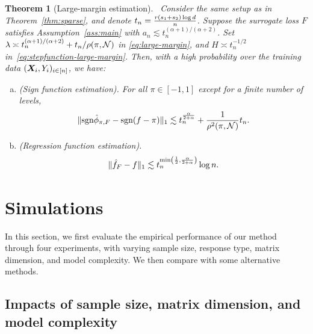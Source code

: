 \documentclass[aos]{imsart}
\newtheorem{theorem}{Theorem}%
\theoremstyle{definition}
\def\sign{\textup{sgn}}
\def\NonparaM{\text{\bf \footnotesize ASSIST }}
\begin{document}
\begin{theorem}[Large-margin estimation]~\label{thm:extension} 
Consider the same setup as in Theorem~\ref{thm:sparse}, and denote $t_n = {r(s_1+s_2)\log d \over n}$. Suppose the surrogate loss $F$ satisfies Assumption~\ref{ass:main} with $a_n \lesssim t_n^{(\alpha+1)/(\alpha+2)}$. Set $\lambda\asymp t_n^{(\alpha+1)/(\alpha+2)}+t_n/\rho(\pi,\mathcal{N}) $ in \eqref{eq:large-margin}, and $H\asymp t_n^{-1/2}$ in~\eqref{eq:stepfunction-large-margin}. Then, with a high probability over the training data $(\bm X_i,Y_i)_{i\in[n]}$, we have:
\begin{enumerate}[(a)]
\item (Sign function estimation). For all $\pi\in[-1,1]$ except for a finite number of levels,
\begin{equation*}
\onenormSize{}{\sign\hat \phi_{\pi,F}-\sign(f-\pi)}\lesssim t_n ^{\alpha\over 2+\alpha}+{1\over \rho^2(\pi,\tN)}t_n.
\end{equation*}

\item (Regression function estimation). 
\begin{equation*}
\onenormSize{}{\hat f_{F}- f} \lesssim  t_n^{\min\left( {1\over 2},{\alpha \over 2+\alpha} \right)}\log n.
\end{equation*}
\end{enumerate}
\end{theorem}





\section{Simulations}
\label{sec:simulation}

In this section, we first evaluate the empirical performance of our method \NonparaM through four experiments, with varying sample size, response type, matrix dimension, and model complexity. We then compare \NonparaM with some alternative methods. 



\subsection{Impacts of sample size, matrix dimension, and model complexity}
\label{sec:validation}
\end{document}

